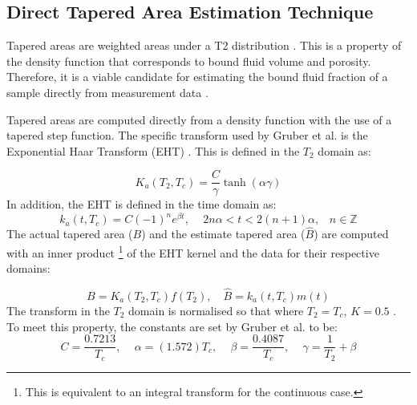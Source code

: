 \subsection{Direct Tapered Area Estimation Technique} \label{ss:taperedAreas}
Tapered areas are weighted areas under a T2 distribution \cite{TaperedAreaskleinberg1997tapered}. This is a property of the density function that corresponds to bound fluid volume and porosity. Therefore, it is a viable candidate for estimating the bound fluid fraction of a sample directly from measurement data \cite{GruberLinearFunctionals2013}.

Tapered areas are computed directly from a density function with the use of a tapered step function. The specific transform used by Gruber et al. is the Exponential Haar Transform (EHT) \cite{GruberLinearFunctionals2013}. This is defined in the $T_2$ domain as:

\begin{equation}
    K_a(T_2, T_c) = \frac{C}{\gamma}\tanh(\alpha \gamma) 
    \label{eq:expHaarTransformT2}
\end{equation}
In addition, the EHT is defined in the time domain as:
\begin{equation}
    k_a(t, T_c) = C(-1)^n e^{\beta t} \text{, } \quad 2n\alpha < t < 2(n+1)\alpha \text{,}   \quad n \in \mathbb{Z}
    \label{eq:expHaarTransformTime}
\end{equation}
The actual tapered area ($B$) and the estimate tapered area ($\hat{B}$) are computed with an inner product \footnote{This is equivalent to an integral transform for the continuous case.} of the EHT kernel and the data for their respective domains:

\begin{equation}
   \label{eq:estTaperedAreas}
   B = K_a(T_2,T_c)f(T_2),  \quad \hat{B} = k_a(t, T_c)m(t)
\end{equation}
The transform in the $T_2$ domain is normalised so that where $T_2 = T_c$, $K = 0.5$ \cite{GruberLinearFunctionals2013}. To meet this property, the constants are set by Gruber et al. to be:
\begin{equation}
    C = \frac{0.7213}{T_c} \text{, } \quad \alpha = (1.572)T_c \text{, } \quad
   \beta = \frac{0.4087}{T_c}  \text{, } \quad \gamma = \frac{1}{T_2} + \beta  
   \label{eq:haarTransformConstants}
\end{equation}









